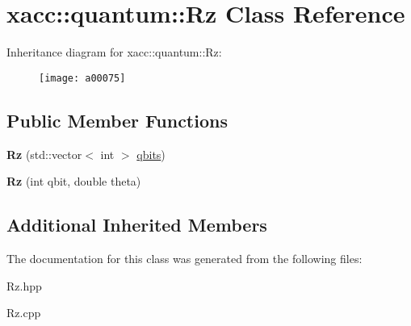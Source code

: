 \hypertarget{a00075}{}\section{xacc\+:\+:quantum\+:\+:Rz Class Reference}
\label{a00075}
Inheritance diagram for xacc\+:\+:quantum\+:\+:Rz\+:\begin{figure}[H]
\begin{center}
\leavevmode
\texttt{[image: a00075]}
\end{center}
\end{figure}
\subsection*{Public Member Functions}
\begin{DoxyCompactItemize}
\item 
{\bfseries Rz} (std\+::vector$<$ int $>$ \hyperlink{a00041_a2a56be6c2519ea65df4d06f4abae1393}{qbits})\hypertarget{a00075_a7ce912c7f9c9e8f4e7e60f9dba95538b}{}\label{a00075_a7ce912c7f9c9e8f4e7e60f9dba95538b}

\item 
{\bfseries Rz} (int qbit, double theta)\hypertarget{a00075_ae30eaf75feb8f896c22043629d21b834}{}\label{a00075_ae30eaf75feb8f896c22043629d21b834}

\end{DoxyCompactItemize}
\subsection*{Additional Inherited Members}


The documentation for this class was generated from the following files\+:\begin{DoxyCompactItemize}
\item 
Rz.\+hpp\item 
Rz.\+cpp\end{DoxyCompactItemize}
